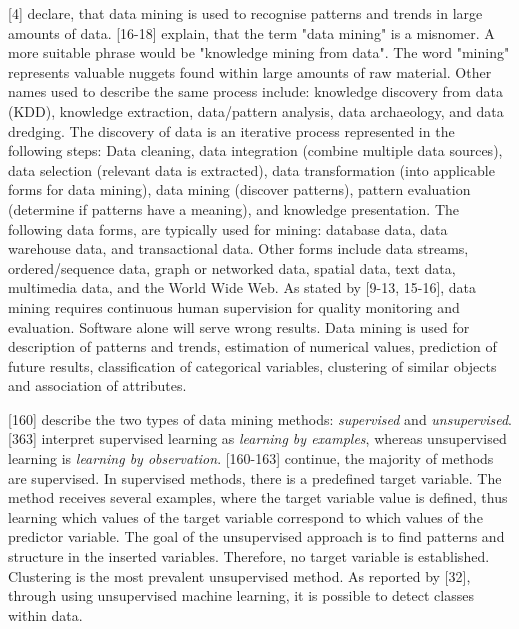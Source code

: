\textcite{DataMiningAndPredictiveAnalytics}[4] declare, that data mining is used to recognise patterns and trends in large amounts of data. \textcite{han2011data}[16-18] explain, that the term "data mining" is a misnomer. A more suitable phrase would be "knowledge mining from data". The word "mining" represents valuable nuggets found within large amounts of raw material. Other names used to describe the same process include: knowledge discovery from data (KDD), knowledge extraction, data/pattern analysis, data archaeology, and data dredging. The discovery of data is an iterative process represented in the following steps: Data cleaning, data integration (combine multiple data sources), data selection (relevant data is extracted), data transformation (into applicable forms for data mining), data mining (discover patterns), pattern evaluation (determine if patterns have a meaning), and knowledge presentation. The following data forms, are typically used for mining: database data, data warehouse data, and transactional data. Other forms include data streams, ordered/sequence data, graph or networked data, spatial data, text data, multimedia data, and the World Wide Web. As stated by \textcite{DataMiningAndPredictiveAnalytics}[9-13, 15-16], data mining requires continuous human supervision for quality monitoring and evaluation. Software alone will serve wrong results. Data mining is used for description of patterns and trends, estimation of numerical values, prediction of future results, classification of categorical variables, clustering of similar objects and association of attributes. 

\textcite{DataMiningAndPredictiveAnalytics}[160] describe the two types of data mining methods: \textit{supervised} and \textit{unsupervised}. \textcite{han2011data}[363] interpret supervised learning as \textit{learning by examples}, whereas unsupervised learning is \textit{learning by observation}. \textcite{DataMiningAndPredictiveAnalytics}[160-163] continue, the majority of methods are supervised. In supervised methods, there is a predefined target variable. The method receives several examples, where the target variable value is defined, thus learning which values of the target variable correspond to which values of the predictor variable. The goal of the unsupervised approach is to find patterns and structure in the inserted variables. Therefore, no target variable is established. Clustering is the most prevalent unsupervised method. As reported by \textcite{han2011data}[32], through using unsupervised machine learning, it is possible to detect classes within data.

